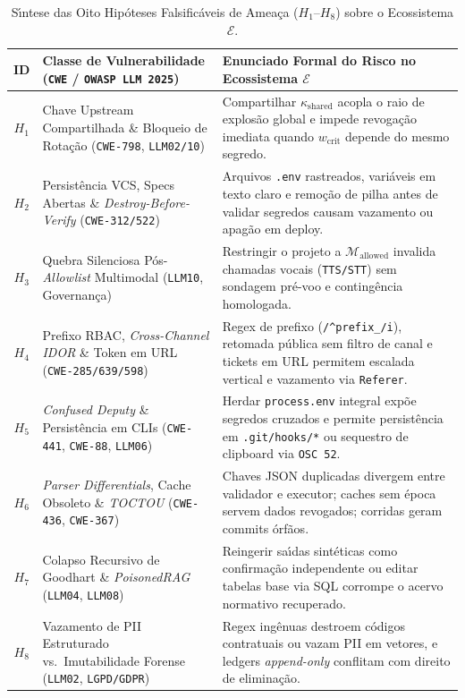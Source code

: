 \documentclass[10pt,twocolumn]{article}
\begin{document}
\begin{table}[t]
\centering
\caption{S\'{\i}ntese das Oito Hip\'{o}teses Falsific\'{a}veis de Amea\c{c}a ($H_1$--$H_8$) sobre o Ecossistema $\mathcal{E}$.}
\label{tab:hypotheses_pt}
\footnotesize
\begin{tabularx}{\textwidth}{@{}c l Y@{}}
\toprule
\textbf{ID} & \textbf{Classe de Vulnerabilidade (\texttt{CWE} / \texttt{OWASP LLM 2025})} & \textbf{Enunciado Formal do Risco no Ecossistema $\mathcal{E}$} \\
\midrule
$H_1$ & Chave Upstream Compartilhada \& Bloqueio de Rota\c{c}\~{a}o (\texttt{CWE-798}, \texttt{LLM02/10}) & Compartilhar $\kappa_{\mathrm{shared}}$ acopla o raio de explos\~{a}o global e impede revoga\c{c}\~{a}o imediata quando $w_{\mathrm{crit}}$ depende do mesmo segredo. \\
\addlinespace[2pt]
$H_2$ & Persist\^{e}ncia VCS, Specs Abertas \& \emph{Destroy-Before-Verify} (\texttt{CWE-312/522}) & Arquivos \texttt{.env} rastreados, vari\'{a}veis em texto claro e remo\c{c}\~{a}o de pilha antes de validar segredos causam vazamento ou apag\~{a}o em deploy. \\
\addlinespace[2pt]
$H_3$ & Quebra Silenciosa P\'{o}s-\emph{Allowlist} Multimodal (\texttt{LLM10}, Governan\c{c}a) & Restringir o projeto a $\mathcal{M}_{\mathrm{allowed}}$ invalida chamadas vocais (\texttt{TTS/STT}) sem sondagem pr\'{e}-voo e conting\^{e}ncia homologada. \\
\addlinespace[2pt]
$H_4$ & Prefixo RBAC, \emph{Cross-Channel IDOR} \& Token em URL (\texttt{CWE-285/639/598}) & Regex de prefixo (\texttt{/\^{}prefix\_/i}), retomada p\'{u}blica sem filtro de canal e tickets em URL permitem escalada vertical e vazamento via \texttt{Referer}. \\
\addlinespace[2pt]
$H_5$ & \emph{Confused Deputy} \& Persist\^{e}ncia em CLIs (\texttt{CWE-441}, \texttt{CWE-88}, \texttt{LLM06}) & Herdar \texttt{process.env} integral exp\~{o}e segredos cruzados e permite persist\^{e}ncia em \texttt{.git/hooks/*} ou sequestro de clipboard via \texttt{OSC 52}. \\
\addlinespace[2pt]
$H_6$ & \emph{Parser Differentials}, Cache Obsoleto \& \emph{TOCTOU} (\texttt{CWE-436}, \texttt{CWE-367}) & Chaves JSON duplicadas divergem entre validador e executor; caches sem \'{e}poca servem dados revogados; corridas geram commits \'{o}rf\~{a}os. \\
\addlinespace[2pt]
$H_7$ & Colapso Recursivo de Goodhart \& \emph{PoisonedRAG} (\texttt{LLM04}, \texttt{LLM08}) & Reingerir sa\'{\i}das sint\'{e}ticas como confirma\c{c}\~{a}o independente ou editar tabelas base via SQL corrompe o acervo normativo recuperado. \\
\addlinespace[2pt]
$H_8$ & Vazamento de PII Estruturado vs.\ Imutabilidade Forense (\texttt{LLM02}, \texttt{LGPD/GDPR}) & Regex ing\^{e}nuas destroem c\'{o}digos contratuais ou vazam PII em vetores, e ledgers \emph{append-only} conflitam com direito de elimina\c{c}\~{a}o. \\
\bottomrule
\end{tabularx}
\end{table}
\end{document}
